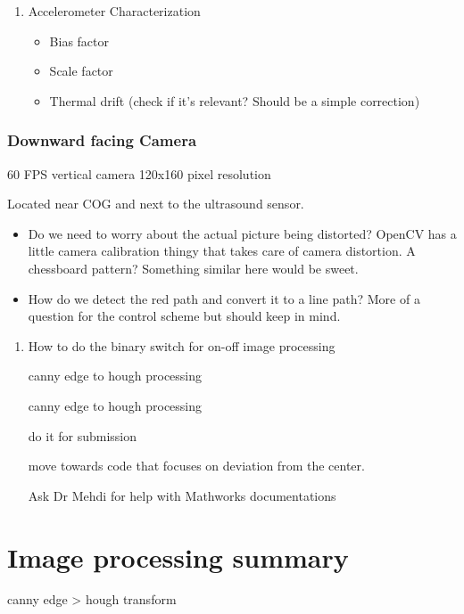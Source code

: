 \documentclass[11pt]{article}
\begin{document}
\begin{enumerate}
\item Accelerometer Characterization
\label{sec:org7251a69}
\begin{itemize}
\item Bias factor
\item Scale factor
\item Thermal drift (check if it's relevant? Should be a simple correction)
\end{itemize}
\end{enumerate}

\subsubsection{Downward facing Camera}
\label{sec:org7fdcce9}
60 FPS vertical camera
120x160 pixel resolution

Located near COG and next to the ultrasound sensor.

\begin{itemize}
\item Do we need to worry about the actual picture being distorted?
OpenCV has a little camera calibration thingy that takes care of camera distortion.
A chessboard pattern? Something similar here would be sweet.

\item How do we detect the red path and convert it to a line path?
More of a question for the control scheme but should keep in mind.
\end{itemize}

\begin{enumerate}
\item How to do the binary switch for on-off image processing
\label{sec:org1248156}

canny edge to hough processing

canny edge to hough processing

do it for submission

move towards code that focuses on deviation from the center.

Ask Dr Mehdi for help with Mathworks documentations
\end{enumerate}


\section{Image processing summary}
\label{sec:orgf472584}

canny edge > hough transform
\end{document}
